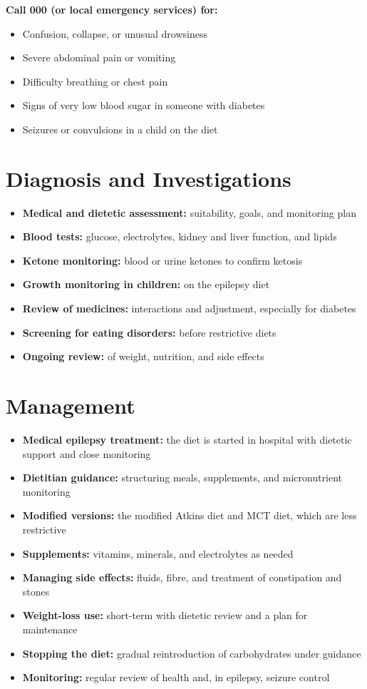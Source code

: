 \textbf{Call 000 (or local emergency services) for:}
\begin{itemize}
    \item Confusion, collapse, or unusual drowsiness
    \item Severe abdominal pain or vomiting
    \item Difficulty breathing or chest pain
    \item Signs of very low blood sugar in someone with diabetes
    \item Seizures or convulsions in a child on the diet
\end{itemize}

\section*{Diagnosis and Investigations}
\begin{itemize}
    \item \textbf{Medical and dietetic assessment:} suitability, goals, and monitoring plan
    \item \textbf{Blood tests:} glucose, electrolytes, kidney and liver function, and lipids
    \item \textbf{Ketone monitoring:} blood or urine ketones to confirm ketosis
    \item \textbf{Growth monitoring in children:} on the epilepsy diet
    \item \textbf{Review of medicines:} interactions and adjustment, especially for diabetes
    \item \textbf{Screening for eating disorders:} before restrictive diets
    \item \textbf{Ongoing review:} of weight, nutrition, and side effects
\end{itemize}

\section*{Management}
\begin{itemize}
    \item \textbf{Medical epilepsy treatment:} the diet is started in hospital with dietetic support and close monitoring
    \item \textbf{Dietitian guidance:} structuring meals, supplements, and micronutrient monitoring
    \item \textbf{Modified versions:} the modified Atkins diet and MCT diet, which are less restrictive
    \item \textbf{Supplements:} vitamins, minerals, and electrolytes as needed
    \item \textbf{Managing side effects:} fluids, fibre, and treatment of constipation and stones
    \item \textbf{Weight-loss use:} short-term with dietetic review and a plan for maintenance
    \item \textbf{Stopping the diet:} gradual reintroduction of carbohydrates under guidance
    \item \textbf{Monitoring:} regular review of health and, in epilepsy, seizure control
\end{itemize}

